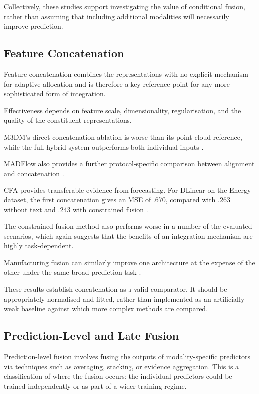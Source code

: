 Collectively, these studies support investigating the value of conditional fusion, rather than
assuming that including additional modalities will necessarily improve prediction.

\subsection{Feature Concatenation}

Feature concatenation combines the representations with no explicit mechanism for adaptive
allocation and is therefore a key reference point for any more sophisticated form of integration.

Effectiveness depends on feature scale, dimensionality, regularisation, and the quality of the
constituent representations.

M3DM's direct concatenation ablation is worse than its point cloud reference, while the full hybrid
system outperforms both individual inputs \parencite[Table~4]{Wang2023Multimodal}.

MADFlow also provides a further protocol-specific comparison between alignment and concatenation
\parencite{Li2025MADFlow}.

CFA provides transferable evidence from forecasting. For DLinear on the Energy dataset, the first
concatenation gives an MSE of .670, compared with .263 without text and .243 with constrained fusion
\parencite[PDF p.~4, Table~4]{P023}.

The constrained fusion method also performs worse in a number of the evaluated scenarios, which
again suggests that the benefits of an integration mechanism are highly task-dependent.

Manufacturing fusion can similarly improve one architecture at the expense of the other under the
same broad prediction task \parencite[Table~3]{Li2022A}.

These results establish concatenation as a valid comparator. It should be appropriately normalised
and fitted, rather than implemented as an artificially weak baseline against which more complex
methods are compared.

\subsection{Prediction-Level and Late Fusion}

Prediction-level fusion involves fusing the outputs of modality-specific predictors via techniques
such as averaging, stacking, or evidence aggregation. This is a classification of where the fusion
occurs; the individual predictors could be trained independently or as part of a wider training
regime.


